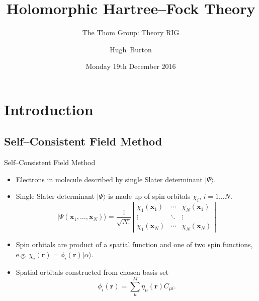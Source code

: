 \documentclass{beamer}
\title[Holomorphic Hartree--Fock Theory]
{%
  Holomorphic Hartree--Fock Theory
}
\subtitle{The Thom Group: Theory RIG}
\author[Burton, Thom]
{
  \hskip-1.7mm
  Hugh~Burton %
}
\institute[Burton and others]
{
  University of Cambridge
}
\date[December 2016]{Monday 19th December 2016}
\newcommand{\ket}[1] {{| #1 \rangle}}
\begin{document}
\begin{frame}
  \titlepage
\end{frame}


\section{Introduction}

\subsection{Self--Consistent Field Method}

\begin{frame}{Self--Consistent Field Method}
 \begin{itemize}
  \item<1-> Electrons in molecule described by single Slater determinant $   \ket{\Psi}$.
  \item<2-> Single Slater determinant $\ket{\Psi}$ is made up of spin orbitals $\chi_i$, $i=1\dots N$.
  $$\ket{\Psi(\mathbf{x}_1, \ldots, \mathbf{x}_N)} =
\frac{1}{\sqrt{N!}}
\left|
   \begin{matrix} \chi_1(\mathbf{x}_1) & \cdots & \chi_N(\mathbf{x}_1) \\
                      \vdots &  \ddots & \vdots \\
                      \chi_1(\mathbf{x}_N) &  \cdots & \chi_N(\mathbf{x}_N)
   \end{matrix} \right|$$
   \item<3-> Spin orbitals are product of a spatial function and one of two spin functions, e.g. $\chi_i(\mathbf{r}) = \phi_i(\mathbf{r}) \ket{\alpha}$.
   \item<4-> Spatial orbitals constructed from chosen basis set 
   $$\phi_i(\mathbf{r})=\sum_\mu^M\eta_\mu(\mathbf{r}) C_{\mu i}.$$
 \end{itemize}
\end{frame} 
\end{document}
